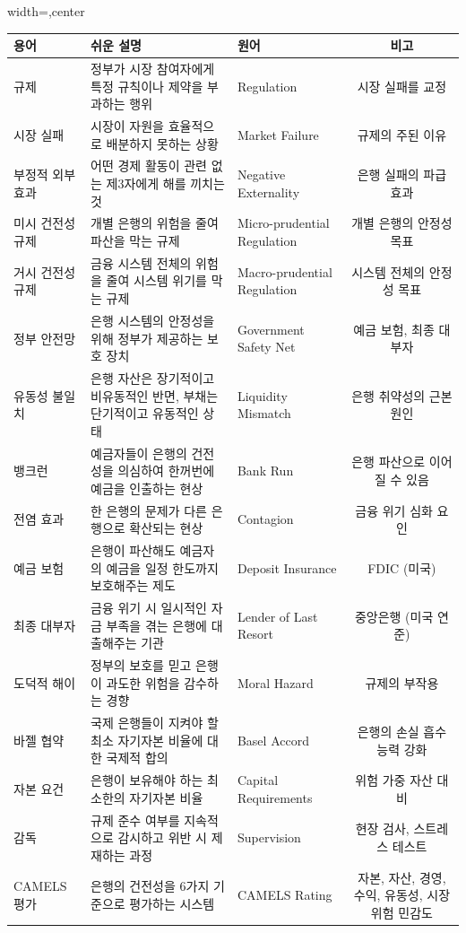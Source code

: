 \documentclass[11pt,a4paper]{article}
\begin{document}
\begin{adjustbox}{width=\textwidth,center}
\begin{tabular}{lllc}
\toprule
\textbf{용어} & \textbf{쉬운 설명} & \textbf{원어} & \textbf{비고} \\
\midrule
규제 & 정부가 시장 참여자에게 특정 규칙이나 제약을 부과하는 행위 & Regulation & 시장 실패를 교정 \\
시장 실패 & 시장이 자원을 효율적으로 배분하지 못하는 상황 & Market Failure & 규제의 주된 이유 \\
부정적 외부 효과 & 어떤 경제 활동이 관련 없는 제3자에게 해를 끼치는 것 & Negative Externality & 은행 실패의 파급 효과 \\
미시 건전성 규제 & 개별 은행의 위험을 줄여 파산을 막는 규제 & Micro-prudential Regulation & 개별 은행의 안정성 목표 \\
거시 건전성 규제 & 금융 시스템 전체의 위험을 줄여 시스템 위기를 막는 규제 & Macro-prudential Regulation & 시스템 전체의 안정성 목표 \\
정부 안전망 & 은행 시스템의 안정성을 위해 정부가 제공하는 보호 장치 & Government Safety Net & 예금 보험, 최종 대부자 \\
유동성 불일치 & 은행 자산은 장기적이고 비유동적인 반면, 부채는 단기적이고 유동적인 상태 & Liquidity Mismatch & 은행 취약성의 근본 원인 \\
뱅크런 & 예금자들이 은행의 건전성을 의심하여 한꺼번에 예금을 인출하는 현상 & Bank Run & 은행 파산으로 이어질 수 있음 \\
전염 효과 & 한 은행의 문제가 다른 은행으로 확산되는 현상 & Contagion & 금융 위기 심화 요인 \\
예금 보험 & 은행이 파산해도 예금자의 예금을 일정 한도까지 보호해주는 제도 & Deposit Insurance & FDIC (미국) \\
최종 대부자 & 금융 위기 시 일시적인 자금 부족을 겪는 은행에 대출해주는 기관 & Lender of Last Resort & 중앙은행 (미국 연준) \\
도덕적 해이 & 정부의 보호를 믿고 은행이 과도한 위험을 감수하는 경향 & Moral Hazard & 규제의 부작용 \\
바젤 협약 & 국제 은행들이 지켜야 할 최소 자기자본 비율에 대한 국제적 합의 & Basel Accord & 은행의 손실 흡수 능력 강화 \\
자본 요건 & 은행이 보유해야 하는 최소한의 자기자본 비율 & Capital Requirements & 위험 가중 자산 대비 \\
감독 & 규제 준수 여부를 지속적으로 감시하고 위반 시 제재하는 과정 & Supervision & 현장 검사, 스트레스 테스트 \\
CAMELS 평가 & 은행의 건전성을 6가지 기준으로 평가하는 시스템 & CAMELS Rating & 자본, 자산, 경영, 수익, 유동성, 시장 위험 민감도 \\

\end{tabular}
\end{adjustbox}
\end{document}
